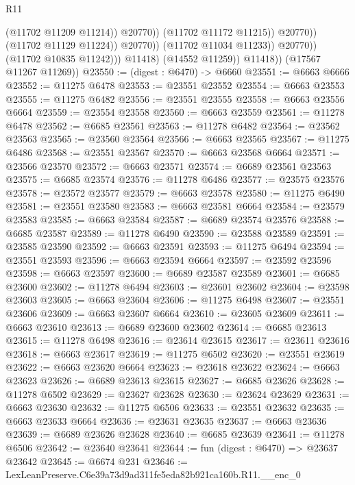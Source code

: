 \begin{lexlean}{R11}
\begin{coremodule}
                                          (@11702 @11209 @11214))
                                        @20770))
                                    (@11702 @11172 @11215))
                                  @20770))
                              (@11702 @11129 @11224))
                            @20770))
                        (@11702 @11034 @11233))
                      @20770))
                  (@11702 @10835 @11242)))
              @11418)
            (@14552 @11259))
          @11418))
      (@17567 @11267 @11269))
@23550 := (digest : @6470) -> @6660
@23551 := @6663 @6666
@23552 := @11275 @6478
@23553 := @23551 @23552
@23554 := @6663 @23553
@23555 := @11275 @6482
@23556 := @23551 @23555
@23558 := @6663 @23556 @6664
@23559 := @23554 @23558
@23560 := @6663 @23559
@23561 := @11278 @6478
@23562 := @6685 @23561
@23563 := @11278 @6482
@23564 := @23562 @23563
@23565 := @23560 @23564
@23566 := @6663 @23565
@23567 := @11275 @6486
@23568 := @23551 @23567
@23570 := @6663 @23568 @6664
@23571 := @23566 @23570
@23572 := @6663 @23571
@23574 := @6689 @23561 @23563
@23575 := @6685 @23574
@23576 := @11278 @6486
@23577 := @23575 @23576
@23578 := @23572 @23577
@23579 := @6663 @23578
@23580 := @11275 @6490
@23581 := @23551 @23580
@23583 := @6663 @23581 @6664
@23584 := @23579 @23583
@23585 := @6663 @23584
@23587 := @6689 @23574 @23576
@23588 := @6685 @23587
@23589 := @11278 @6490
@23590 := @23588 @23589
@23591 := @23585 @23590
@23592 := @6663 @23591
@23593 := @11275 @6494
@23594 := @23551 @23593
@23596 := @6663 @23594 @6664
@23597 := @23592 @23596
@23598 := @6663 @23597
@23600 := @6689 @23587 @23589
@23601 := @6685 @23600
@23602 := @11278 @6494
@23603 := @23601 @23602
@23604 := @23598 @23603
@23605 := @6663 @23604
@23606 := @11275 @6498
@23607 := @23551 @23606
@23609 := @6663 @23607 @6664
@23610 := @23605 @23609
@23611 := @6663 @23610
@23613 := @6689 @23600 @23602
@23614 := @6685 @23613
@23615 := @11278 @6498
@23616 := @23614 @23615
@23617 := @23611 @23616
@23618 := @6663 @23617
@23619 := @11275 @6502
@23620 := @23551 @23619
@23622 := @6663 @23620 @6664
@23623 := @23618 @23622
@23624 := @6663 @23623
@23626 := @6689 @23613 @23615
@23627 := @6685 @23626
@23628 := @11278 @6502
@23629 := @23627 @23628
@23630 := @23624 @23629
@23631 := @6663 @23630
@23632 := @11275 @6506
@23633 := @23551 @23632
@23635 := @6663 @23633 @6664
@23636 := @23631 @23635
@23637 := @6663 @23636
@23639 := @6689 @23626 @23628
@23640 := @6685 @23639
@23641 := @11278 @6506
@23642 := @23640 @23641
@23644 := fun (digest : @6470) => @23637 @23642
@23645 := @6674 @231
@23646 := LexLeanPreserve.C6e39a73d9ad311fe5eda82b921ca160b.R11.__enc_0

\end{coremodule}
\end{lexlean}
